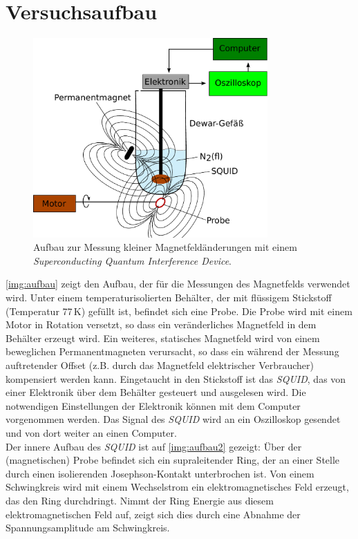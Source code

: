 \section{Versuchsaufbau}

\begin{figure}[H]
\begin{center}
  \includegraphics[width=0.8\textwidth]{../img/aufbau.pdf}
  \caption{Aufbau zur Messung kleiner Magnetfeldänderungen mit einem
  \emph{Superconducting Quantum Interference Device}.}
  \label{img:aufbau}
\end{center}
\end{figure}

\autoref{img:aufbau} zeigt den Aufbau, der für die Messungen des Magnetfelds verwendet wird.
Unter einem temperaturisolierten Behälter, der mit flüssigem Stickstoff (Temperatur 77\,K) gefüllt ist,
befindet sich eine Probe.
Die Probe wird mit einem Motor in Rotation versetzt,
so dass ein veränderliches Magnetfeld in dem Behälter erzeugt wird.
Ein weiteres, statisches Magnetfeld wird von einem beweglichen Permanentmagneten verursacht,
so dass ein während der Messung auftretender Offset (z.B. durch das Magnetfeld elektrischer Verbraucher)
kompensiert werden kann.
Eingetaucht in den Stickstoff ist das \emph{SQUID},
das von einer Elektronik über dem Behälter gesteuert und ausgelesen wird.
Die notwendigen Einstellungen der Elektronik können mit dem Computer vorgenommen werden.
Das Signal des \emph{SQUID} wird an ein Oszilloskop gesendet und
von dort weiter an einen Computer.\\
Der innere Aufbau des \emph{SQUID} ist auf \autoref{img:aufbau2} gezeigt:
Über der (magnetischen) Probe befindet sich ein supraleitender Ring, der an einer Stelle durch einen
isolierenden Josephson-Kontakt unterbrochen ist.
Von einem Schwingkreis wird mit einem Wechselstrom ein elektromagnetisches Feld erzeugt,
das den Ring durchdringt. Nimmt der Ring Energie aus diesem elektromagnetischen Feld auf,
zeigt sich dies durch eine Abnahme der Spannungsamplitude am Schwingkreis. 




